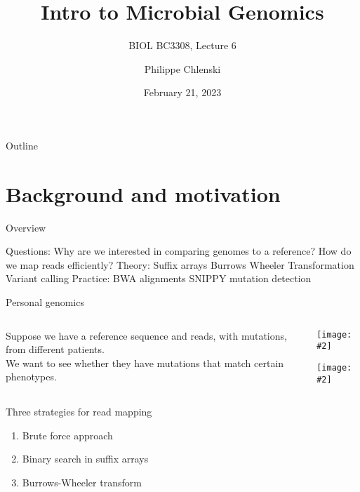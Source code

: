 \documentclass{beamer}
\title{Intro to Microbial Genomics}
\subtitle{BIOL BC3308, Lecture 6}
\author{Philippe Chlenski}
\date{February 21, 2023}
\renewcommand{\c}[1]{\begin{center}#1\end{center}}
\newcommand{\gr}[2][.95]{\c{\texttt{[image: \#2]}}}
\begin{document}
\begin{frame}[plain]
\titlepage
\end{frame}

\begin{frame}{Outline}
\tableofcontents
\end{frame}

\section{Background and motivation}

\begin{frame}{Overview}
    \begin{outline}
        \1[] Questions:
            \2 Why are we interested in comparing genomes to a reference?
            \2 How do we map reads efficiently?
        \1[] Theory:
            \2 Suffix arrays
            \2 Burrows Wheeler Transformation
            \2 Variant calling
        \1[] Practice:
            \2 BWA alignments
            \2 SNIPPY mutation detection
    \end{outline}
\end{frame}

\begin{frame}{Personal genomics}
    \begin{columns}
        \begin{column}{0.5\textwidth}
            Suppose we have a reference sequence and reads, with mutations, from different patients.\\
            \bigskip We want to see whether they have mutations that match certain phenotypes.
        \end{column}
        \begin{column}{0.5\textwidth}
            \gr{l6_figs/s3_snps.png}
            \gr[0.6]{l6_figs/s3_phenotypes.png}
        \end{column}
    \end{columns}
\end{frame}

\begin{frame}{Three strategies for read mapping}
    \begin{enumerate}
        \item Brute force approach
        \item Binary search in suffix arrays
        \item Burrows-Wheeler transform
    \end{enumerate}
\end{frame}
\end{document}

